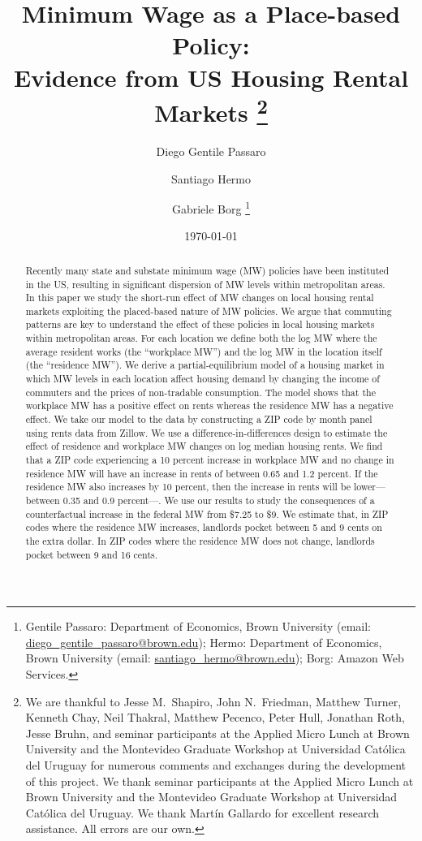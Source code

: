\documentclass{article}
\title{ Minimum Wage as a Place-based Policy: \\
        Evidence from US Housing Rental Markets%
        \thanks{We are thankful to Jesse M.\ Shapiro, John N.\ Friedman, 
        Matthew Turner, Kenneth Chay, Neil Thakral, Matthew Pecenco, Peter Hull,
        Jonathan Roth, Jesse Bruhn, 
        and seminar participants at the Applied Micro Lunch at Brown
        University and the Montevideo Graduate Workshop at Universidad Católica 
        del Uruguay
        for numerous comments and exchanges during the development of 
        this project.
        We thank seminar participants at the Applied Micro Lunch at Brown
        University and the Montevideo Graduate Workshop at Universidad Católica 
        del Uruguay.
        We thank Martín Gallardo for excellent research assistance.
        All errors are our own.}}
\author{Diego Gentile Passaro \and Santiago Hermo \and Gabriele Borg
        \footnote{Gentile Passaro: Department of Economics, Brown University 
        (email: \url{diego_gentile_passaro@brown.edu}); 
        Hermo: Department of Economics, Brown University 
        (email: \url{santiago_hermo@brown.edu});
        Borg: Amazon Web Services.}}
\date{\today}
\begin{document}
\maketitle

\begin{abstract}
    \noindent
    Recently many state and substate minimum wage (MW) policies have been 
    instituted in the US, resulting in significant dispersion of MW levels 
    within metropolitan areas.
    In this paper we study the short-run effect of MW changes on local housing 
    rental markets exploiting the placed-based nature of MW policies.
    We argue that commuting patterns are key to understand the effect of these
    policies in local housing markets within metropolitan areas.
    For each location we define both
    the log MW where the average resident works (the ``workplace MW'')
    and the log MW in the location itself (the ``residence MW'').
    We derive a partial-equilibrium model of a housing market
    in which MW levels in each location affect housing demand by 
    changing the income of commuters and the prices of non-tradable consumption. 
    The model shows that the workplace MW has a positive effect on rents 
    whereas the residence MW has a negative effect.
    We take our model to the data by constructing a ZIP code by month panel 
    using rents data from Zillow.
    We use a difference-in-differences design to estimate the effect of 
    residence and workplace MW changes on log median housing rents.
    We find that a ZIP code experiencing a 10 percent increase in workplace MW
    and no change in residence MW will have an increase in rents of between 
    0.65 and 1.2 percent.
    If the residence MW also increases by 10 percent, then the increase in 
    rents will be lower---between 0.35 and 0.9 percent---.
    We use our results to study the consequences of a counterfactual increase in 
    the federal MW from \$7.25 to \$9.
    We estimate that, in ZIP codes where the residence MW increases, landlords 
    pocket between 5 and 9 cents on the extra dollar.
    In ZIP codes where the residence MW does not change, landlords pocket 
    between 9 and 16 cents.
\end{abstract}

\vspace{5mm}
\end{document}
